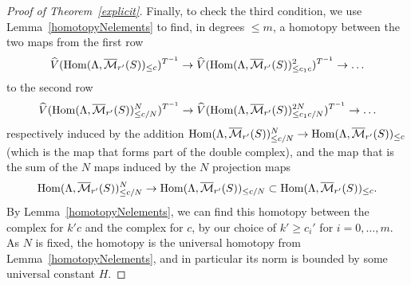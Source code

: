 \begin{proof}[Proof of Theorem~\ref{explicit}]
Finally, to check the third condition, we use Lemma~\ref{homotopyNelements} to find, in degrees $\leq m$, a homotopy between the two maps from the first row
\[
\widehat{V}(\operatorname{Hom}(\Lambda,\overline{\mathcal M}_{r'}(S))_{\leq c})^{T^{-1}}\to \widehat{V}(\operatorname{Hom}(\Lambda,\overline{\mathcal M}_{r'}(S))_{\leq c_1c}^2)^{T^{-1}}\to \ldots
\]
to the second row
\[
\widehat{V}(\operatorname{Hom}(\Lambda,\overline{\mathcal M}_{r'}(S))_{\leq c/N}^N)^{T^{-1}}\to \widehat{V}(\operatorname{Hom}(\Lambda,\overline{\mathcal M}_{r'}(S))_{\leq c_1c/N}^{2N})^{T^{-1}}\to \ldots
\]
respectively induced by the addition $\operatorname{Hom}(\Lambda,\overline{\mathcal M}_{r'}(S))_{\leq c/N}^N\to \operatorname{Hom}(\Lambda,\overline{\mathcal M}_{r'}(S))_{\leq c}$ (which is the map that forms part of the double complex), and the map that is the sum of the $N$ maps induced by the $N$ projection maps
\[
\operatorname{Hom}(\Lambda,\overline{\mathcal M}_{r'}(S))_{\leq c/N}^N\to \operatorname{Hom}(\Lambda,\overline{\mathcal M}_{r'}(S))_{\leq c/N}\subset \operatorname{Hom}(\Lambda,\overline{\mathcal M}_{r'}(S))_{\leq c}.
\]
By Lemma~\ref{homotopyNelements}, we can find this homotopy between the complex for $k'c$ and the complex for $c$, by our choice of $k'\geq c_i'$ for $i=0,\ldots,m$. As $N$ is fixed, the homotopy is the universal homotopy from Lemma~\ref{homotopyNelements}, and in particular its norm is bounded by some universal constant $H$.


\end{proof}
